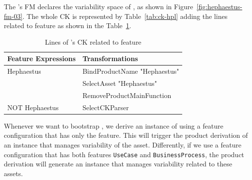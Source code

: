
The \hpl{}'s FM declares the variability space of \hpl{}, as shown in Figure~\ref{fig:hephaestus-fm-03}.  The whole  CK is represented by Table~\ref{tab:ck-hpl} adding the lines related to \texttt{\hp{}} feature as shown in the Table~\ref{tab:ck-hpl-2}.


\begin{table}[h]
\begin{center}
\begin{tabular}{||l||l||}
  \hline
  \textbf{Feature Expressions} & \textbf{Transformations}   \\  \hline
  Hephaestus & BindProductName "Hephaestus" \\
             &  SelectAsset "Hephaestus"   \\
             &  RemoveProductMainFunction \\ \hline
  NOT Hephaestus & SelectCKParser \\ \hline
\end{tabular}
\caption{Lines of \hpl's CK related to \texttt{\hp{}} feature}
\label{tab:ck-hpl-2}
\end{center}
\end{table}


Whenever we want to bootstrap \hpl, we derive an instance of \hpl{} using a feature configuration that has only the \texttt{\hp{}} feature. This will trigger the product derivation of an instance that manages variability of the \hp{} asset. Differently, if we use a feature configuration that has both features \texttt{UseCase} and \texttt{BusinessProcess}, the product derivation will generate an \hpl{} instance that manages variability related to these assets.

